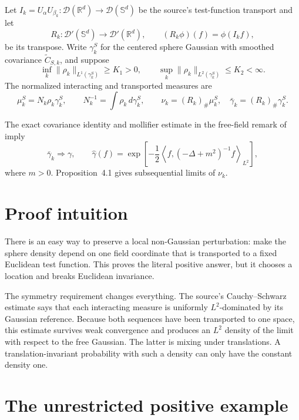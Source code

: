 \documentclass[11pt]{article}
\newcommand{\R}{\mathbb R}
\newcommand{\D}{\mathcal D}
\begin{document}
Let $I_k=U_\alpha U_{\beta_k}:\D(\R^d)\to\D(\mathbb S^d)$ be the source's
test-function transport and let
\[
 R_k:\D'(\mathbb S^d)\longrightarrow\D'(\R^d),\qquad
 (R_k\phi)(f)=\phi(I_kf),
\]
be its transpose.  Write $\gamma_k^S$ for the centered sphere Gaussian with
smoothed covariance $\widetilde C_{S,k}$, and suppose
\begin{equation}\label{eq:bounds}
 \inf_k\|\rho_k\|_{L^1(\gamma_k^S)}\ge K_1>0,
 \qquad
 \sup_k\|\rho_k\|_{L^2(\gamma_k^S)}\le K_2<\infty.
\end{equation}
The normalized interacting and transported measures are
\[
 \mu_k^S=N_k\rho_k\gamma_k^S,
 \qquad N_k^{-1}=\int\rho_k\,d\gamma_k^S,
 \qquad
 \nu_k=(R_k)_\#\mu_k^S,
 \quad \bar\gamma_k=(R_k)_\#\gamma_k^S.
\]

The exact covariance identity and mollifier estimate in the free-field remark
of \cite{source} imply
\begin{equation}\label{eq:freeconv}
 \bar\gamma_k\Longrightarrow\gamma,
 \qquad
 \widehat\gamma(f)=
 \exp\!\left[-\frac12\left\langle
 f,(-\Delta+m^2)^{-1}f\right\rangle_{L^2}\right],
\end{equation}
where $m>0$.  Proposition~4.1 gives subsequential limits of $\nu_k$.

\section{Proof intuition}

There is an easy way to preserve a local non-Gaussian perturbation: make the
sphere density depend on one field coordinate that is transported to a fixed
Euclidean test function.  This proves the literal positive answer, but it
chooses a location and breaks Euclidean invariance.

The symmetry requirement changes everything.  The source's Cauchy--Schwarz
estimate says that each interacting measure is uniformly $L^2$-dominated by
its Gaussian reference.  Because both sequences have been transported to one
space, this estimate survives weak convergence and produces an $L^2$ density
of the limit with respect to the free Gaussian.  The latter is mixing under
translations.  A translation-invariant probability with such a density can
only have the constant density one.

\section{The unrestricted positive example}
\end{document}
